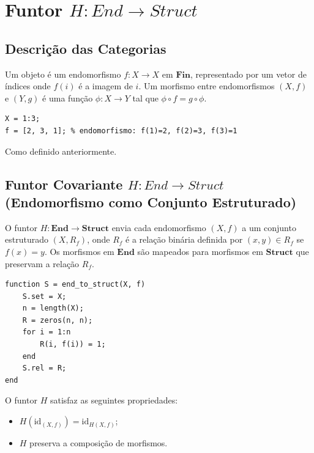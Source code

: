\section{Funtor $H: End \to Struct$}
\label{sec:functor-end-struct}

\subsection{Descrição das Categorias}

\begin{definition}
Um objeto é um endomorfismo $f: X \to X$ em $\mathbf{Fin}$, representado por um vetor de índices onde $f(i)$ é a imagem de $i$. Um morfismo entre endomorfismos $(X, f)$ e $(Y, g)$ é uma função $\phi: X \to Y$ tal que $\phi \circ f = g \circ \phi$.
\end{definition}

\begin{lstlisting}[style=matlab, caption={Objeto e morfismo em $\mathbf{End}$}]
X = 1:3;
f = [2, 3, 1]; % endomorfismo: f(1)=2, f(2)=3, f(3)=1
\end{lstlisting}

\begin{definition}
Como definido anteriormente.
\end{definition}

\subsection{Funtor Covariante $H: End \to Struct$ (Endomorfismo como Conjunto Estruturado)}

O funtor $H: \mathbf{End} \to \mathbf{Struct}$ envia cada endomorfismo $(X, f)$ a um conjunto estruturado $(X, R_f)$, onde $R_f$ é a relação binária definida por $(x, y) \in R_f$ se $f(x) = y$. Os morfismos em $\mathbf{End}$ são mapeados para morfismos em $\mathbf{Struct}$ que preservam a relação $R_f$.

\begin{lstlisting}[style=matlab, caption={Funtor $H$ aplicado a um endomorfismo}]
function S = end_to_struct(X, f)
    S.set = X;
    n = length(X);
    R = zeros(n, n);
    for i = 1:n
        R(i, f(i)) = 1;
    end
    S.rel = R;
end
\end{lstlisting}

\begin{proposition}
O funtor $H$ satisfaz as seguintes propriedades:
\begin{itemize}
    \item $H(\mathrm{id}_{(X,f)}) = \mathrm{id}_{H(X,f)}$;
    \item $H$ preserva a composição de morfismos.
\end{itemize}
\end{proposition}

